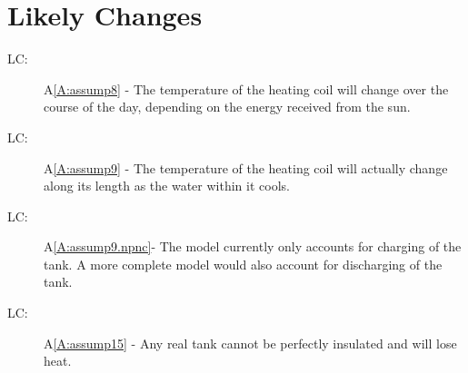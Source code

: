 \documentclass[12pt]{article}
\newcounter{lcnum}
\newcommand{\lcthelcnum}{LC\thelcnum}
\begin{document}
\section{Likely Changes}
\label{Sec:LCs}
\begin{description}
\item[\lcthelcnum\label{LC:likeChg2}:]A\ref{A:assump8} - The temperature of the heating coil will change over the course of the day, depending on the energy received from the sun.
\end{description}
\begin{description}
\item[\lcthelcnum\label{LC:likeChg3}:]A\ref{A:assump9} - The temperature of the heating coil will actually change along its length as the water within it cools.
\end{description}
\begin{description}
\item[\lcthelcnum\label{LC:likeChg3}:]A\ref{A:assump9.npnc}- The model currently only accounts for charging of the tank. A more complete model would also account for discharging of the tank.
\end{description}
\begin{description}
\item[\lcthelcnum\label{LC:likeChg6}:]A\ref{A:assump15} - Any real tank cannot be perfectly insulated and will lose heat.
\end{description}
\end{document}
